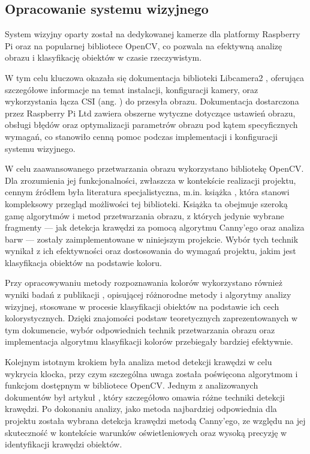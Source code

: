 \subsection{Opracowanie systemu wizyjnego}

System wizyjny oparty został na dedykowanej kamerze dla platformy Raspberry Pi oraz na popularnej bibliotece OpenCV, co pozwala na efektywną analizę obrazu i klasyfikację obiektów w czasie rzeczywistym. 

W tym celu kluczowa okazała się dokumentacja biblioteki Libcamera2 \cite{bib:manualLibcamera2}, oferująca szczegółowe informacje na temat instalacji, konfiguracji kamery, oraz wykorzystania łącza CSI (ang. ) do przesyła obrazu. Dokumentacja dostarczona przez Raspberry Pi Ltd zawiera obszerne wytyczne dotyczące ustawień obrazu, obsługi błędów oraz optymalizacji parametrów obrazu pod kątem specyficznych wymagań, co stanowiło cenną pomoc podczas implementacji i konfiguracji systemu wizyjnego.

W celu zaawansowanego przetwarzania obrazu wykorzystano bibliotekę OpenCV. Dla zrozumienia jej funkcjonalności, zwłaszcza w kontekście realizacji projektu, cennym źródłem była literatura specjalistyczna, m.in. książka \cite{bib:ksiazka}, która stanowi kompleksowy przegląd możliwości tej biblioteki. Książka ta obejmuje szeroką gamę algorytmów i metod przetwarzania obrazu, z których jedynie wybrane fragmenty — jak detekcja krawędzi za pomocą algorytmu Canny’ego oraz analiza barw — zostały zaimplementowane w niniejszym projekcie. Wybór tych technik wynikał z ich efektywności oraz dostosowania do wymagań projektu, jakim jest klasyfikacja obiektów na podstawie koloru.

Przy opracowywaniu metody rozpoznawania kolorów wykorzystano również wyniki badań z publikacji \cite{bib:artykul2}, opisującej różnorodne metody i algorytmy analizy wizyjnej, stosowane w procesie klasyfikacji obiektów na podstawie ich cech kolorystycznych. Dzięki znajomości podstaw teoretycznych zaprezentowanych w tym dokumencie, wybór odpowiednich technik przetwarzania obrazu oraz implementacja algorytmu klasyfikacji kolorów przebiegały bardziej efektywnie.

Kolejnym istotnym krokiem była analiza metod detekcji krawędzi w celu wykrycia klocka, przy czym szczególna uwaga została poświęcona algorytmom i funkcjom dostępnym w bibliotece OpenCV. Jednym z analizowanych dokumentów był artykuł \cite{bib:artykul}, który szczegółowo omawia różne techniki detekcji krawędzi. Po dokonaniu analizy, jako metoda najbardziej odpowiednia dla projektu została wybrana detekcja krawędzi metodą Canny’ego, ze względu na jej skuteczność w kontekście warunków oświetleniowych oraz wysoką precyzję w identyfikacji krawędzi obiektów.


